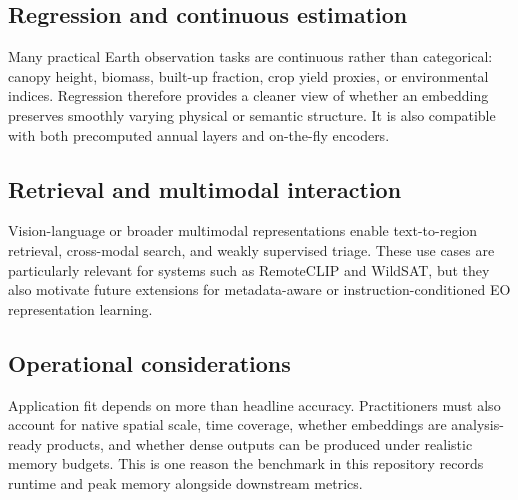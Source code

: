 \subsection{Regression and continuous estimation}

Many practical Earth observation tasks are continuous rather than categorical: canopy height, biomass, built-up fraction, crop yield proxies, or environmental indices. Regression therefore provides a cleaner view of whether an embedding preserves smoothly varying physical or semantic structure. It is also compatible with both precomputed annual layers and on-the-fly encoders.

\subsection{Retrieval and multimodal interaction}

Vision-language or broader multimodal representations enable text-to-region retrieval, cross-modal search, and weakly supervised triage. These use cases are particularly relevant for systems such as RemoteCLIP and WildSAT, but they also motivate future extensions for metadata-aware or instruction-conditioned EO representation learning.

\subsection{Operational considerations}

Application fit depends on more than headline accuracy. Practitioners must also account for native spatial scale, time coverage, whether embeddings are analysis-ready products, and whether dense outputs can be produced under realistic memory budgets. This is one reason the benchmark in this repository records runtime and peak memory alongside downstream metrics.
